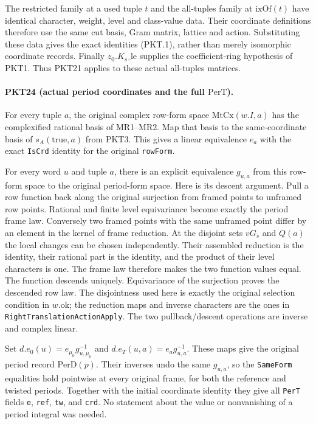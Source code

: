 The restricted family at a used tuple $t$ and the all-tuples family at
$\mathrm{ixOf}(t)$ have identical character, weight, level and class-value
data.  Their coordinate definitions therefore use the same cut basis,
Gram matrix, lattice and action.  Substituting these data gives the exact
identities (PKT.1), rather than merely isomorphic coordinate records.
Finally $z_0.K_s\mathrm{\_le}$ supplies the coefficient-ring hypothesis
of PKT1.  Thus PKT21 applies to these actual all-tuples matrices.

\paragraph{PKT24 (actual period coordinates and the full $\mathrm{PerT}$).}\label{claim:PKT24}
For every tuple $a$, the original complex row-form space
$\mathrm{MtCx}(w.I,a)$ has the complexified rational basis of MR1--MR2.
Map that basis to the same-coordinate basis of $s_A(\mathrm{true},a)$
from PKT3.  This gives a linear equivalence $e_a$ with the exact
\texttt{IsCrd} identity for the original \texttt{rowForm}.

For every word $u$ and tuple $a$, there is an explicit equivalence
$g_{u,a}$ from this row-form space to the original period-form space.
Here is its descent argument.  Pull a row function back along the original
surjection from framed points to unframed row points.  Rational and finite
level equivariance become exactly the period frame law.  Conversely two
framed points with the same unframed point differ by an element in the
kernel of frame reduction.  At the disjoint sets $vG_s$ and $Q(a)$ the
local changes can be chosen independently.  Their assembled reduction is
the identity, their rational part is the identity, and the product of their
level characters is one.  The frame law therefore makes the two function
values equal.  The function descends uniquely.  Equivariance of the
surjection proves the descended row law.  The disjointness used here is
exactly the original selection condition in $w.\mathrm{ok}$; the
reduction maps and inverse characters are the ones in
\texttt{RightTranslationActionApply}.  The two pullback/descent operations
are inverse and complex linear.

Set $d.e_0(u)=e_{\mu_0}g_{u,\mu_0}^{-1}$ and
$d.e_T(u,a)=e_ag_{u,a}^{-1}$.  These maps give the original period record
$\mathrm{PerD}(p)$.  Their inverses undo the same $g_{u,a}$, so the
\texttt{SameForm} equalities hold pointwise at every original frame, for
both the reference and twisted periods.  Together with the initial
coordinate identity they give all \texttt{PerT} fields \texttt{e},
\texttt{ref}, \texttt{tw}, and \texttt{crd}.  No statement about the value
or nonvanishing of a period integral was needed.

